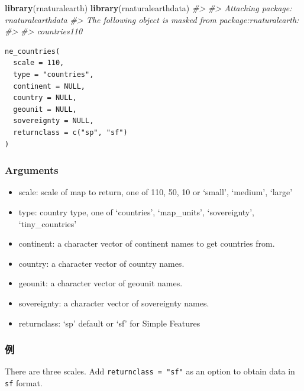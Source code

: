 \documentclass[
  xelatex, ja=standard]{bxjsbook}
\newenvironment{Shaded}{\begin{snugshade}}{\end{snugshade}}
\newcommand{\CommentTok}[1]{\textcolor[rgb]{0.56,0.35,0.01}{\textit{#1}}}
\newcommand{\FunctionTok}[1]{\textcolor[rgb]{0.13,0.29,0.53}{\textbf{#1}}}
\newcommand{\NormalTok}[1]{#1}
\providecommand{\tightlist}{%
  \setlength{\itemsep}{0pt}\setlength{\parskip}{0pt}}
\theoremstyle{definition}
\theoremstyle{definition}
\theoremstyle{definition}
\theoremstyle{definition}
\theoremstyle{remark}
\begin{document}
\begin{Shaded}
\begin{Highlighting}[]
\FunctionTok{library}\NormalTok{(rnaturalearth)}
\FunctionTok{library}\NormalTok{(rnaturalearthdata)}
\CommentTok{\#\textgreater{} }
\CommentTok{\#\textgreater{} Attaching package: \textquotesingle{}rnaturalearthdata\textquotesingle{}}
\CommentTok{\#\textgreater{} The following object is masked from \textquotesingle{}package:rnaturalearth\textquotesingle{}:}
\CommentTok{\#\textgreater{} }
\CommentTok{\#\textgreater{}     countries110}
\end{Highlighting}
\end{Shaded}

\begin{verbatim}
ne_countries(
  scale = 110,
  type = "countries",
  continent = NULL,
  country = NULL,
  geounit = NULL,
  sovereignty = NULL,
  returnclass = c("sp", "sf")
)
\end{verbatim}

\hypertarget{arguments}{%
\subsubsection{Arguments}\label{arguments}}

\begin{itemize}
\tightlist
\item
  scale: scale of map to return, one of 110, 50, 10 or `small', `medium', `large'
\item
  type: country type, one of `countries', `map\_units', `sovereignty', `tiny\_countries'
\item
  continent: a character vector of continent names to get countries from.
\item
  country: a character vector of country names.
\item
  geounit: a character vector of geounit names.
\item
  sovereignty: a character vector of sovereignty names.
\item
  returnclass: `sp' default or `sf' for Simple Features
\end{itemize}

\hypertarget{ux4f8b-1}{%
\subsubsection{例}\label{ux4f8b-1}}

There are three scales. Add \texttt{returnclass\ =\ "sf"} as an option to obtain data in \texttt{sf} format.
\end{document}

